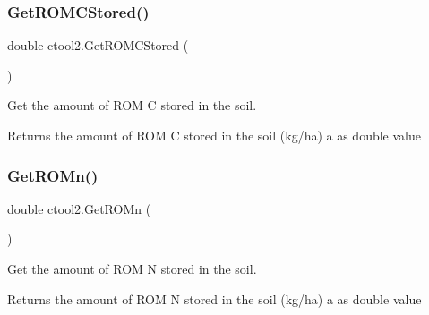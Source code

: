 \subsubsection{\texorpdfstring{GetROMCStored()}{GetROMCStored()}}
{\footnotesize\ttfamily double ctool2.\+Get\+R\+O\+M\+C\+Stored (\begin{DoxyParamCaption}{ }\end{DoxyParamCaption})\hspace{0.3cm}{\ttfamily [inline]}}



Get the amount of R\+OM C stored in the soil. 

\begin{DoxyReturn}{Returns}
the amount of R\+OM C stored in the soil (kg/ha) a as double value 
\end{DoxyReturn}
\mbox{\label{classctool2_a31a62472fb74dbafbc296ecd074c8d5e}} 
\subsubsection{\texorpdfstring{GetROMn()}{GetROMn()}}
{\footnotesize\ttfamily double ctool2.\+Get\+R\+O\+Mn (\begin{DoxyParamCaption}{ }\end{DoxyParamCaption})\hspace{0.3cm}{\ttfamily [inline]}}



Get the amount of R\+OM N stored in the soil. 

\begin{DoxyReturn}{Returns}
the amount of R\+OM N stored in the soil (kg/ha) a as double value 
\end{DoxyReturn}
\mbox{\label{classctool2_ad657aea1170e4929c7b96709f319f41c}} 
